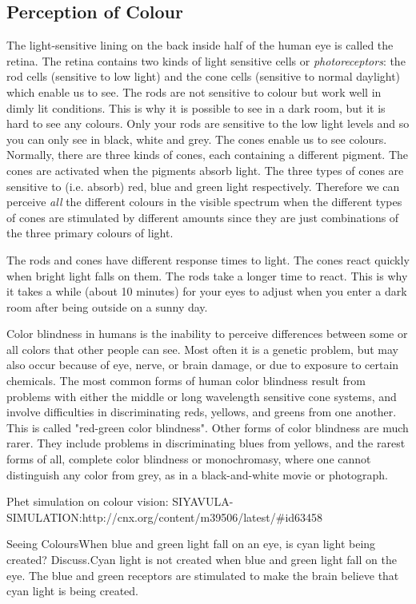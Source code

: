 \subsection{Perception of Colour}
The light-sensitive lining on the back inside half of the human eye is called the retina. 
The retina contains two kinds of light sensitive cells or \textit{photoreceptors}: the rod cells (sensitive to low light) and the cone cells (sensitive to normal daylight) which enable us to see. The rods are not sensitive to colour but work well in dimly lit conditions. This is why it is possible to see in a dark room, but it is hard to see any colours. Only your rods are sensitive to the low light levels and so you can only see in black, white and grey.
The cones enable us to see colours.
Normally, there are three kinds of cones, each containing a different pigment. The cones are activated when the pigments absorb light. 
The three types of cones are sensitive to (i.e. absorb) red, blue and green light respectively. Therefore we can perceive \textit{all} the different colours in the visible spectrum when the different types of cones are stimulated by different amounts since they are just combinations of the three primary colours of light.

The rods and cones have different response times to light. The cones react quickly when bright light falls on them. The rods take a longer time to react. This is why it takes a while (about 10 minutes) for your eyes to adjust when you enter a dark room after being outside on a sunny day. 


\begin{IFact}
{Color blindness in humans is the inability to perceive differences between some or all colors that other people can see. Most often it is a genetic problem, but may also occur because of eye, nerve, or brain damage, or due to exposure to certain chemicals. The most common forms of human color blindness result from problems with either the middle or long wavelength sensitive cone systems, and involve difficulties in discriminating reds, yellows, and greens from one another. This is called "red-green color blindness". Other forms of color blindness are much rarer. They include problems in discriminating blues from yellows, and the rarest forms of all, complete color blindness or monochromasy, where one cannot distinguish any color from grey, as in a black-and-white movie or photograph.}
\end{IFact}
Phet simulation on colour vision: SIYAVULA-SIMULATION:http://cnx.org/content/m39506/latest/#id63458
\begin{wex}{Seeing Colours}{When blue and green light fall on an eye, is cyan light being created? Discuss.}{Cyan light is not created when blue and green light fall on the eye. The blue and green receptors are stimulated to make the brain believe that cyan light is being created.}
\end{wex}

